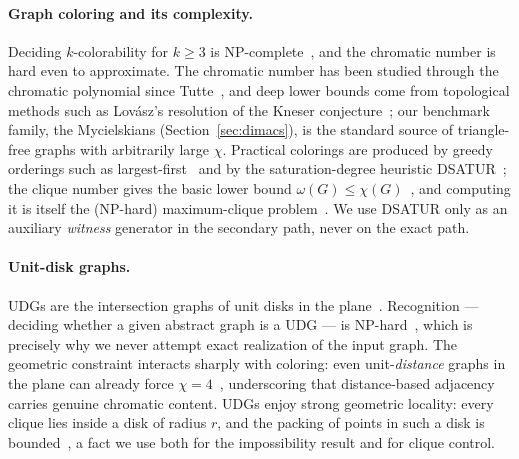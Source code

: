 \documentclass[11pt]{article}
\theoremstyle{definition}
\theoremstyle{remark}
\begin{document}
\paragraph{Graph coloring and its complexity.} Deciding $k$-colorability for
$k\ge 3$ is NP-complete~\cite{Karp1972,GareyJohnson1979}, and the chromatic number
is hard even to approximate. The chromatic number has been studied through the
chromatic polynomial since Tutte~\cite{Tutte1954}, and deep lower bounds come from
topological methods such as Lov\'asz's resolution of the Kneser
conjecture~\cite{Lovasz1983}; our benchmark family, the Mycielskians
(Section~\ref{sec:dimacs}), is the standard source of triangle-free graphs with
arbitrarily large $\chi$. Practical colorings are produced by greedy orderings
such as largest-first~\cite{Welsh1967} and by the saturation-degree heuristic
DSATUR~\cite{Brelaz1979}; the clique number gives the basic lower bound
$\omega(G)\le\chi(G)$~\cite{West2001}, and computing it is itself the (NP-hard)
maximum-clique problem~\cite{Bomze1999}. We use DSATUR only as an auxiliary
\emph{witness} generator in the secondary path, never on the exact path.

\paragraph{Unit-disk graphs.} UDGs are the intersection graphs of unit disks in
the plane~\cite{Clark1990UDG}. Recognition --- deciding whether a given abstract
graph is a UDG --- is NP-hard~\cite{Breu1998,Jungck2021}, which is precisely why
we never attempt exact realization of the input graph. The geometric constraint
interacts sharply with coloring: even unit-\emph{distance} graphs in the plane can
already force $\chi=4$~\cite{Clark1990}, underscoring that distance-based
adjacency carries genuine chromatic content. UDGs enjoy strong
geometric locality: every clique lies inside a disk of radius $r$, and the
packing of points in such a disk is bounded~\cite{Heppes2003}, a fact we use both
for the impossibility result and for clique control.
\end{document}
